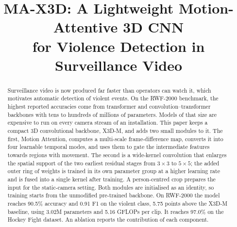 \documentclass[conference]{IEEEtran}
\begin{document}
\title{MA-X3D: A Lightweight Motion-Attentive 3D CNN\\
for Violence Detection in Surveillance Video}

\author{
\and
{}
}

\maketitle

\begin{abstract}
Surveillance video is now produced far faster than operators can watch
it, which motivates automatic detection of violent events. On the
RWF-2000 benchmark, the highest reported accuracies come from
transformer and convolution--transformer backbones with tens to
hundreds of millions of parameters. Models of that size are expensive to
run on every camera stream of an installation. This paper keeps a
compact 3D convolutional backbone, X3D-M, and adds two small modules to
it. The first, Motion Attention, computes a multi-scale frame-difference
map, converts it into four learnable temporal modes, and uses them to
gate the intermediate features towards regions with movement. The second
is a wide-kernel convolution that enlarges the spatial support of the
two earliest residual stages from $3\times3$ to $5\times5$; the added
outer ring of weights is trained in its own parameter group at a higher
learning rate and is fused into a single kernel after training. A
person-centred crop prepares the input for the static-camera setting.
Both modules are initialised as an identity, so training starts from the
unmodified pre-trained backbone. On RWF-2000 the model reaches 90.5\%
accuracy and 0.91 F1 on the violent class, 5.75 points above the X3D-M
baseline, using 3.02M parameters and 5.16 GFLOPs per clip. It reaches
97.0\% on the Hockey Fight dataset. An ablation reports the contribution
of each component.
\end{abstract}
\end{document}
